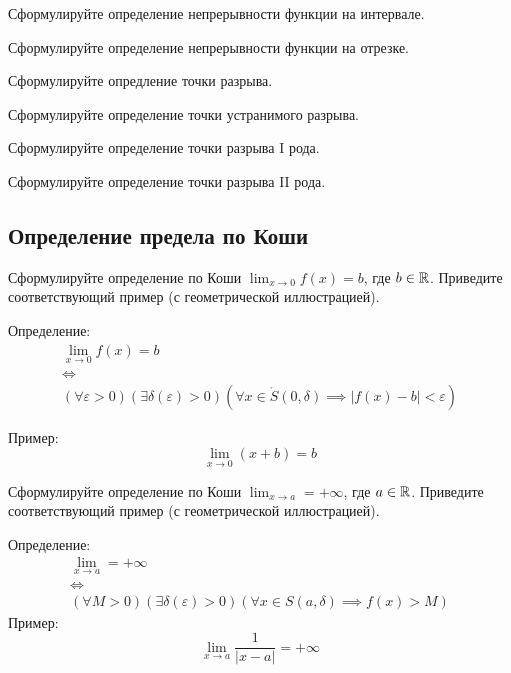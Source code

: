 \begin{question}
  Сформулируйте определение непрерывности функции на интервале.
\end{question}

\begin{question}
  Сформулируйте определение непрерывности функции на отрезке.
\end{question}

\begin{question}
  Сформулируйте опредление точки разрыва.
\end{question}

\begin{question}
  Сформулируйте определение точки устранимого разрыва.
\end{question}

\begin{question}
  Сформулируйте определение точки разрыва I рода.
\end{question}

\begin{question}
  Сформулируйте определение точки разрыва II рода.
\end{question}


\subsection{Определение предела по Коши}

\begin{question}
  Сформулируйте определение по Коши $\lim_{x \to 0} f(x) = b$, где $b \in \mathbb{R}$.
Приведите соответствующий пример (с геометрической иллюстрацией).
\end{question}
\begin{answer}
  Определение:
  \begin{gather*}
    \lim_{x \to 0} f(x) = b \\
    \iff \\
    (\forall \varepsilon > 0)(\exists \delta(\varepsilon) > 0)(\forall x \in \mathring{S}(0, \delta) \implies |f(x) - b| < \varepsilon)
  \end{gather*}

  Пример: \[
    \lim_{x \to 0} (x + b) = b  
  \] 
\end{answer}

\begin{question}
  Сформулируйте определение по Коши $\lim_{x \to a} = +\infty$, где $a \in \mathbb{R}$.
Приведите соответствующий пример (с геометрической иллюстрацией).
\end{question}
\begin{answer}
  Определение:
  \begin{gather*}
    \lim_{x \to a} = +\infty \\
    \iff \\
    (\forall M > 0)(\exists \delta(\varepsilon) > 0)(\forall x \in S(a, \delta) \implies f(x) > M) 
  \end{gather*}
  Пример: \[
  \lim_{x \to a} \frac{1}{|x - a|} = +\infty
  \] 
\end{answer}

